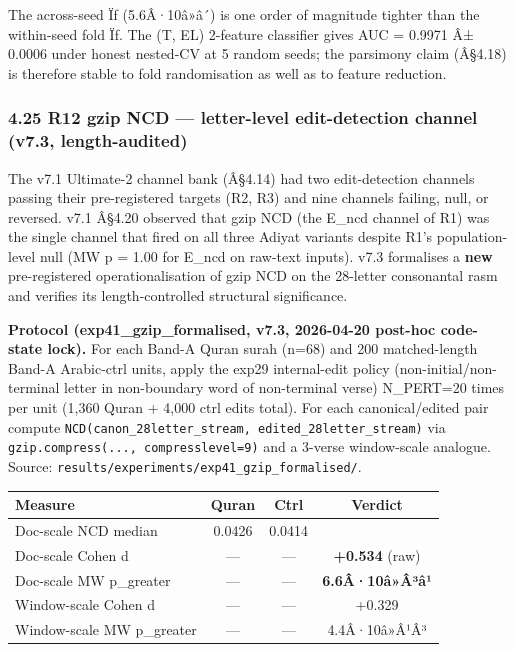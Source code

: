\documentclass[
]{article}
\newcounter{none} %
\begin{document}
The across-seed Ïƒ (5.6Â·10â»â´) is one order of magnitude tighter than
the within-seed fold Ïƒ. The (T, EL) 2-feature classifier gives AUC =
0.9971 Â± 0.0006 under honest nested-CV at 5 random seeds; the parsimony
claim (Â§4.18) is therefore stable to fold randomisation as well as to
feature reduction.

\subsubsection{4.25 R12 gzip NCD --- letter-level edit-detection channel
(v7.3,
length-audited)}\label{r12-gzip-ncd-letter-level-edit-detection-channel-v7.3-length-audited}

The v7.1 Ultimate-2 channel bank (Â§4.14) had two edit-detection
channels passing their pre-registered targets (R2, R3) and nine channels
failing, null, or reversed. v7.1 Â§4.20 observed that gzip NCD (the
E\_ncd channel of R1) was the single channel that fired on all three
Adiyat variants despite R1's population-level null (MW p = 1.00 for
E\_ncd on raw-text inputs). v7.3 formalises a \textbf{new}
pre-registered operationalisation of gzip NCD on the 28-letter
consonantal rasm and verifies its length-controlled structural
significance.

\textbf{Protocol (exp41\_gzip\_formalised, v7.3, 2026-04-20 post-hoc
code-state lock).} For each Band-A Quran surah (n=68) and 200
matched-length Band-A Arabic-ctrl units, apply the exp29 internal-edit
policy (non-initial/non-terminal letter in non-boundary word of
non-terminal verse) N\_PERT=20 times per unit (1,360 Quran + 4,000 ctrl
edits total). For each canonical/edited pair compute
\texttt{NCD(canon\_28letter\_stream,\ edited\_28letter\_stream)} via
\texttt{gzip.compress(...,\ compresslevel=9)} and a 3-verse window-scale
analogue. Source: \texttt{results/experiments/exp41\_gzip\_formalised/}.

{\def\LTcaptype{none} %
\begin{longtable}[]{@{}lccc@{}}
\toprule\noalign{}
Measure & Quran & Ctrl & Verdict \\
\midrule\noalign{}
\endhead
\bottomrule\noalign{}
\endlastfoot
Doc-scale NCD median & 0.0426 & 0.0414 & \\
Doc-scale Cohen d & --- & --- & \textbf{+0.534} (raw) \\
Doc-scale MW p\_greater & --- & --- & \textbf{6.6Â·10â»Â³â¹} \\
Window-scale Cohen d & --- & --- & +0.329 \\
Window-scale MW p\_greater & --- & --- & 4.4Â·10â»Â¹Â³ \\
\end{longtable}
}
\end{document}
